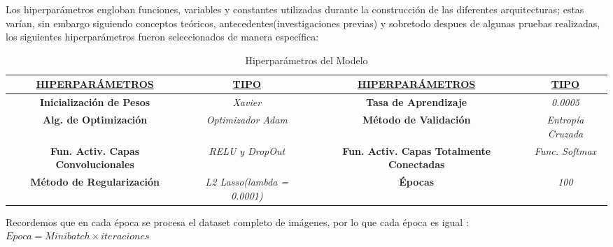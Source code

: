 	Los hiperparámetros engloban funciones, variables y constantes utilizadas durante la construcción de las diferentes arquitecturas; estas varían, sin embargo siguiendo conceptos teóricos, antecedentes(investigaciones previas) y sobretodo despues de algunas pruebas realizadas, los siguientes hiperparámetros fueron seleccionados de manera específica:
		\begin{table}[H]
			\begin{center}
			\caption{\small{Hiperparámetros del Modelo}}
			\begin{tabular}{|>{\scriptsize}c|>{\scriptsize}c|>{\scriptsize}c|>{\scriptsize}c|}
			\hline
			{\ul \textbf{HIPERPARÁMETROS}}  & {\ul \textbf{TIPO}}       & {\ul \textbf{HIPERPARÁMETROS}}        & {\ul \textbf{TIPO}}        \\ \hline
			{\textbf{Inicialización de Pesos}}                     		& {\textit{Xavier}}  				  &
			\textbf{Tasa de Aprendizaje}                                & \textit{0.0005}                    \\ \hline
			\textbf{Alg. de Optimización}                               & \textit{Optimizador Adam}          &
			\textbf{Método de Validación}                               & \textit{Entropía Cruzada}          \\ \hline
			\textbf{Fun. Activ. Capas Convolucionales}        			& \textit{RELU y DropOut}                      &
			\textbf{Fun. Activ. Capas Totalmente Conectadas} 			& \textit{Func. Softmax}           \\ \hline
			\textbf{Método de Regularización}                           &\textit{L2 Lasso(lambda = 0.0001)} &
			\textbf{Épocas}                                             &\textit{100}		 				\\ \hline
			\end{tabular}
			\end{center}
		\end{table}
		\vspace{-1.5em}

		Recordemos que en cada época se procesa el dataset completo de imágenes, por lo que cada época es igual : \begingroup\makeatletter\def\f@size{11}\check@mathfonts	$Epoca = Mini batch \times iteraciones$ \endgroup

